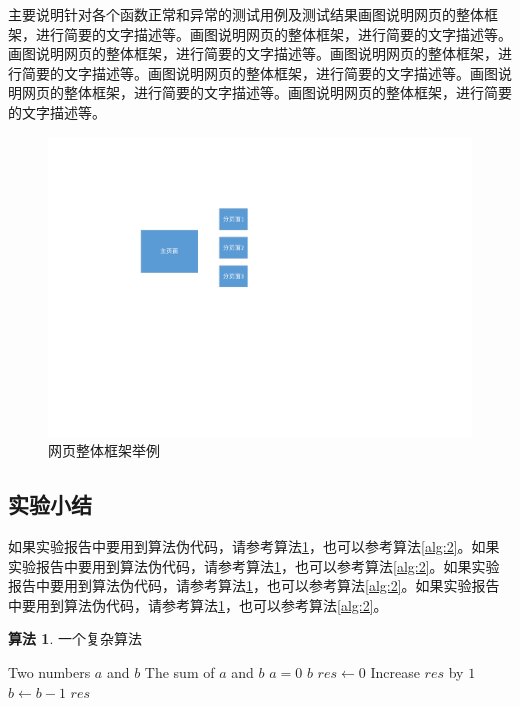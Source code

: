 \documentclass[supercite]{Experimental_Report}
\theoremstyle{definition}
\newtheorem{alg}{算法}[section]
\begin{document}
主要说明针对各个函数正常和异常的测试用例及测试结果画图说明网页的整体框架，进行简要的文字描述等。画图说明网页的整体框架，进行简要的文字描述等。画图说明网页的整体框架，进行简要的文字描述等。画图说明网页的整体框架，进行简要的文字描述等。画图说明网页的整体框架，进行简要的文字描述等。画图说明网页的整体框架，进行简要的文字描述等。画图说明网页的整体框架，进行简要的文字描述等。

\begin{figure}[htb] %
	\begin{center}
		\includegraphics[scale=0.80]{images/1-1.pdf}
		\caption{网页整体框架举例}
		\label{fig3-1}
	\end{center}
\end{figure}

\subsection{实验小结}

如果实验报告中要用到算法伪代码，请参考算法\ref{alg:1}，也可以参考算法\ref{alg:2}。如果实验报告中要用到算法伪代码，请参考算法\ref{alg:1}，也可以参考算法\ref{alg:2}。如果实验报告中要用到算法伪代码，请参考算法\ref{alg:1}，也可以参考算法\ref{alg:2}。如果实验报告中要用到算法伪代码，请参考算法\ref{alg:1}，也可以参考算法\ref{alg:2}。

\begin{shaded*}\begin{alg}{一个复杂算法}
		\label{alg:1}
		\begin{algorithmic}
			\Input Two numbers $a$ and $b$
			\Output The sum of $a$ and $b$
			\If $a = 0$
			\State \Return $b$
			\EndIf
			\State $res \gets 0$
			\State Increase $res$ by $1$
			\State $b \gets b - 1$
			\EndWhile
			\State \Return $res$
			\EndProcedure
		\end{algorithmic}
\end{alg}\end{shaded*}
\end{document}
